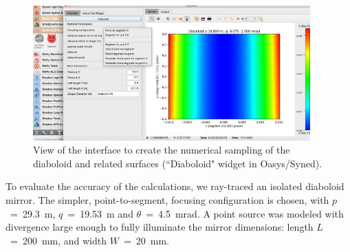 \documentclass{iucr}       %
\begin{document}
\begin{figure}\label{fig:widget}
\centering
\includegraphics[width=0.95\textwidth]{figures/widget.png}
\caption{View of the interface to create the numerical sampling of the diaboloid and related surfaces (``Diaboloid" widget in Oasys/Syned).}
\end{figure}

To evaluate the accuracy of the calculations, we ray-traced an isolated diaboloid mirror. The simpler, point-to-segment, focusing configuration is chosen, with $p$~=~\SI{29.3}{\meter}, $q$~=~\SI{19.53}{\meter} and $\theta$~=~\SI{4.5}{\milli\radian}. A point source was modeled with divergence large enough to fully illuminate the mirror dimensions: length $L$~=~\SI{200}{\milli\meter}, and width $W$~=~\SI{20}{\milli\meter}.
\end{document}
